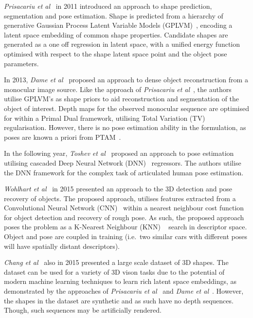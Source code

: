 \textit{Prisacariu et al}~\cite{Prisacariu2011} in 2011 introduced an approach to shape prediction, 
segmentation and pose estimation. Shape is predicted from a hierarchy of generative Gaussian Process 
Latent Variable Models (GPLVM)~\cite{Lawrence2005}, encoding a latent space embedding of common shape 
properties. Candidate shapes are generated as a one off regression in latent space, with a unified 
energy function optimised with respect to the shape latent space point and the object pose parameters.

In 2013, \textit{Dame et al}~\cite{Dame2013} proposed an approach to dense object reconstruction from a 
monocular image source. Like the approach of \textit{Prisacariu et al}~\cite{Prisacariu2011}, the authors 
utilise GPLVM's as shape priors to aid reconstruction and segmentation of the object of interest. Depth maps 
for the observed monocular sequence are optimised for within a Primal Dual framework, utilising 
Total Variation (TV)~\cite{Rudin1992} regularisation. However, there is no pose estimation 
ability in the formulation, as poses are known a priori from PTAM~\cite{Klein2007}.

In the following year, \textit{Toshev et al}~\cite{Toshev2014} proposed an approach to pose estimation 
utilising cascaded Deep Neural Network (DNN)~\cite{LeCun2015} regressors. The authors utilise the DNN 
framework for the complex task of articulated human pose estimation.

\textit{Wohlhart et al}~\cite{Wohlhart2015} in 2015 presented an approach to the 3D detection and pose 
recovery of objects. The proposed approach, utilises features extracted from a Convolutional Neural 
Network (CNN)~\cite{LeCun2015} within a nearest neighbour cost function for object detection and recovery 
of rough pose. As such, the proposed approach poses the problem as a K-Nearest Neighbour (KNN) 
~\cite{Altman1992} search in descriptor space. Object and pose are coupled in training (i.e.\ two similar 
cars with different poses will have spatially distant descriptors).

\textit{Chang et al}~\cite{Chang2015} also in 2015 presented a large scale dataset of 3D shapes. The 
dataset can be used for a variety of 3D vison tasks due to the potential of modern machine learning 
techniques to learn rich latent space embeddings, as demonstrated by the approaches of 
\textit{Prisacariu et al}~\cite{Prisacariu2011} and \textit{Dame et al}~\cite{Dame2013}. However, the 
shapes in the dataset are synthetic and as such have no depth sequences. Though, such sequences may be 
artificially rendered.

